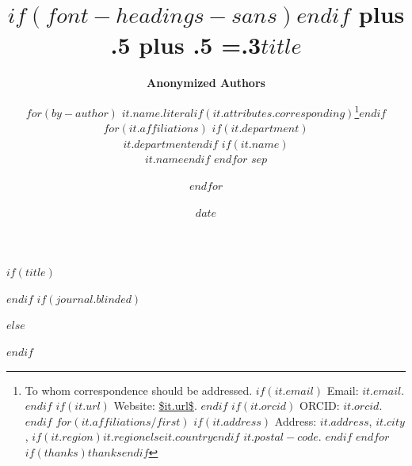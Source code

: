 \makeatletter
\newcommand\@shorttitle{}
\newcommand\shorttitle[1]{\renewcommand\@shorttitle{#1}}
\usepackage{fancyhdr}
\fancyhf{}
\pagestyle{fancy}
\renewcommand{\headrulewidth}{0pt}
\fancyheadoffset{0pt}
\lhead{\scshape \@shorttitle}
\cfoot{\thepage}
\makeatother
\renewenvironment{abstract}{
  \centerline
  {\large$if(font-headings-sans)$\sffamily$endif$\bfseries Abstract}\vspace{-0.25em}
  \begin{quote}\small
}{
  \end{quote}
}

$if(title)$
\title{$if(font-headings-sans)$\sffamily$endif$\bfseries\huge\parfillskip=0pt
\rightskip=0pt plus .5\textwidth
\leftskip=0pt plus .5\textwidth
\emergencystretch=.3\textwidth $title$}
\shorttitle{$title-meta$}
$endif$
$if(journal.blinded)$
\author{\textbf{Anonymized Authors}}
$else$
\author{$for(by-author)$
\textbf{$it.name.literal$}$if(it.attributes.corresponding)$\footnote{
To whom correspondence should be addressed.
$if(it.email)$
Email: \texttt{\href{mailto:$it.email$}{$it.email$}}.
$endif$
$if(it.url)$
Website: \url{$it.url$}.
$endif$
$if(it.orcid)$
ORCID: \texttt{\href{https://orcid.org/$it.orcid$}{$it.orcid$}}.
$endif$
$for(it.affiliations/first)$
$if(it.address)$
Address:
$it.address$, $it.city$, $if(it.region)$$it.region$$else$$it.country$$endif$ $it.postal-code$.
$endif$
$endfor$
$if(thanks)$$thanks$$endif$}$endif$
$for(it.affiliations)$
$if(it.department)$\\$it.department$$endif$%
$if(it.name)$\\$it.name$$endif$%
\vspace{2pt}
$endfor$ $sep$
\and $endfor$}
$endif$
\date{$date$}
